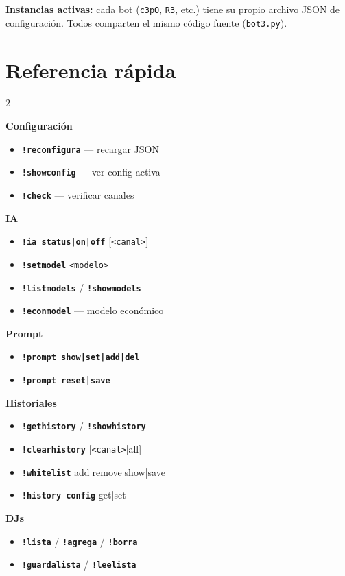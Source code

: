 \documentclass[a4paper,10pt]{article}
\newcommand{\cmd}[1]{\texttt{\color{cmdcolor}\bfseries #1}}
\newcommand{\param}[1]{\texttt{\color{paramcolor}<#1>}}
\begin{document}
\textbf{Instancias activas:} cada bot (\texttt{c3pO}, \texttt{R3}, etc.) tiene su propio archivo JSON de configuración. Todos comparten el mismo código fuente (\texttt{bot3.py}).

\section{Referencia rápida}

\begin{multicols}{2}
\footnotesize

\textbf{Configuración}
\begin{itemize}[nosep,leftmargin=1em]
  \item \cmd{!reconfigura} — recargar JSON
  \item \cmd{!showconfig} — ver config activa
  \item \cmd{!check} — verificar canales
\end{itemize}

\textbf{IA}
\begin{itemize}[nosep,leftmargin=1em]
  \item \cmd{!ia status|on|off} [\param{canal}]
  \item \cmd{!setmodel} \param{modelo}
  \item \cmd{!listmodels} / \cmd{!showmodels}
  \item \cmd{!econmodel} — modelo económico
\end{itemize}

\textbf{Prompt}
\begin{itemize}[nosep,leftmargin=1em]
  \item \cmd{!prompt show|set|add|del}
  \item \cmd{!prompt reset|save}
\end{itemize}

\textbf{Historiales}
\begin{itemize}[nosep,leftmargin=1em]
  \item \cmd{!gethistory} / \cmd{!showhistory}
  \item \cmd{!clearhistory} [\param{canal}|all]
  \item \cmd{!whitelist} add|remove|show|save
  \item \cmd{!history config} get|set
\end{itemize}

\textbf{DJs}
\begin{itemize}[nosep,leftmargin=1em]
  \item \cmd{!lista} / \cmd{!agrega} / \cmd{!borra}
  \item \cmd{!guardalista} / \cmd{!leelista}
\end{itemize}


\end{multicols}
\end{document}

